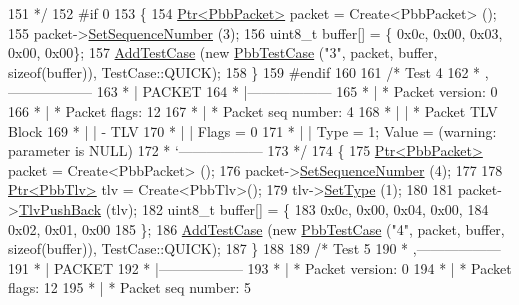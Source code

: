 \begin{DoxyCode}
151 \textcolor{comment}{   */}
152 \textcolor{preprocessor}{#if 0}
153   \{
154     \hyperlink{classns3_1_1Ptr}{Ptr<PbbPacket>} packet = Create<PbbPacket> ();
155     packet->\hyperlink{classns3_1_1PbbPacket_a7d6a1602be86109760d0f26ff9bbbb8e}{SetSequenceNumber} (3);
156     uint8\_t buffer[] = \{ 0x0c, 0x00, 0x03, 0x00, 0x00\};
157     \hyperlink{classns3_1_1TestCase_a3718088e3eefd5d6454569d2e0ddd835}{AddTestCase} (\textcolor{keyword}{new} \hyperlink{classPbbTestCase}{PbbTestCase} (\textcolor{stringliteral}{"3"}, packet, buffer, \textcolor{keyword}{sizeof}(buffer)), 
      TestCase::QUICK);
158   \}
159 \textcolor{preprocessor}{#endif}
160 
161   \textcolor{comment}{/* Test 4}
162 \textcolor{comment}{   * ,------------------}
163 \textcolor{comment}{         * |  PACKET}
164 \textcolor{comment}{         * |------------------}
165 \textcolor{comment}{         * | * Packet version:    0}
166 \textcolor{comment}{         * | * Packet flags:  12}
167 \textcolor{comment}{         * | * Packet seq number: 4}
168 \textcolor{comment}{         * |    | * Packet TLV Block}
169 \textcolor{comment}{         * |    |     - TLV}
170 \textcolor{comment}{         * |    |         Flags = 0}
171 \textcolor{comment}{         * |    |         Type = 1; Value = (warning: parameter is NULL)}
172 \textcolor{comment}{         * `------------------}
173 \textcolor{comment}{   */}
174   \{
175     \hyperlink{classns3_1_1Ptr}{Ptr<PbbPacket>} packet = Create<PbbPacket> ();
176     packet->\hyperlink{classns3_1_1PbbPacket_a7d6a1602be86109760d0f26ff9bbbb8e}{SetSequenceNumber} (4);
177 
178     \hyperlink{classns3_1_1Ptr}{Ptr<PbbTlv>} tlv = Create<PbbTlv>();
179     tlv->\hyperlink{classns3_1_1PbbTlv_a90a0452018ed364ac37c3ad116dd718b}{SetType} (1);
180 
181     packet->\hyperlink{classns3_1_1PbbPacket_a34935793e729a106c176db99c969cb42}{TlvPushBack} (tlv);
182     uint8\_t buffer[] = \{
183       0x0c, 0x00, 0x04, 0x00,
184       0x02, 0x01, 0x00
185     \};
186     \hyperlink{classns3_1_1TestCase_a3718088e3eefd5d6454569d2e0ddd835}{AddTestCase} (\textcolor{keyword}{new} \hyperlink{classPbbTestCase}{PbbTestCase} (\textcolor{stringliteral}{"4"}, packet, buffer, \textcolor{keyword}{sizeof}(buffer)), 
      TestCase::QUICK);
187   \}
188 
189   \textcolor{comment}{/* Test 5}
190 \textcolor{comment}{         * ,------------------}
191 \textcolor{comment}{         * |  PACKET}
192 \textcolor{comment}{         * |------------------}
193 \textcolor{comment}{         * | * Packet version:    0}
194 \textcolor{comment}{         * | * Packet flags:  12}
195 \textcolor{comment}{         * | * Packet seq number: 5}

\end{DoxyCode}
